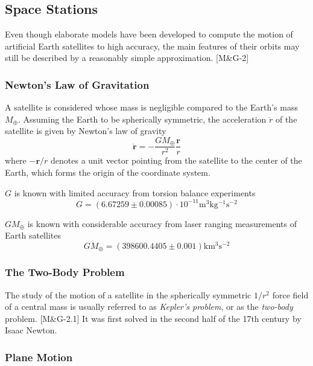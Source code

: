 \documentclass[11pt]{article}
\begin{document}
\subsection{Space Stations}

Even though elaborate models have been developed to compute
the motion of artificial Earth satellites to high accuracy, the main
features of their orbits may still be described by a reasonably simple
approximation. [M\&G-2]

\subsubsection{Newton's Law of Gravitation}

A satellite is considered whose mass is negligible compared to the
Earth's mass $M_{\oplus}$. Assuming the Earth to be spherically
symmetric, the acceleration $\ddot{r}$ of the satellite is given by
Newton's law of gravity
\begin{equation}
  \ddot{\boldsymbol{r}} = -\frac{GM_{\oplus}}{r^2}\frac{\boldsymbol{r}}{r} \label{2.1}\tag{2.1}
\end{equation}
where $-\boldsymbol{r}/r$ denotes a unit vector pointing from the
satellite to the center of the Earth, which forms the origin of the
coordinate system.

$G$ is known with limited accuracy from torsion balance experiments
\begin{equation}
  G = (6.67259 \pm 0.00085)\cdot 10^{-11} \mathrm{m^3kg^{-1}s^{-2}} \label{2.2}\tag{2.2}
\end{equation}

$GM_{\oplus}$ is known with considerable accuracy from laser ranging
measurements of Earth satellites
\begin{equation}
  GM_{\oplus} = (398600.4405 \pm 0.001) \mathrm{km^3s^{-2}} \label{2.3}\tag{2.3}
\end{equation}

\subsubsection{The Two-Body Problem}

The study of the motion of a satellite in the spherically
symmetric $1/r^2$ force field of a central mass is usually referred to
as {\em Kepler's problem}, or as the {\em two-body} problem. [M\&G-2.1] It was
first solved in the second half of the 17th century by Isaac Newton.

\subsubsection{Plane Motion}
\end{document}
